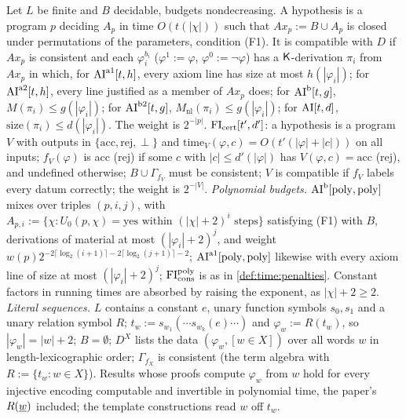 \begin{definition}\label{def:time:short}
Let $L$ be finite and $B$ decidable, budgets nondecreasing. A hypothesis is a program $p$ deciding $A_p$ in time $O(t(|\chi|))$ such that $Ax_p:=B\cup A_p$ is closed under permutations of the parameters, condition (F1). It is compatible with $D$ if $Ax_p$ is consistent and each $\varphi_i^{b_i}$ ($\varphi^1:=\varphi$, $\varphi^0:=\neg\varphi$) has a $\mathsf{K}$-derivation $\pi_i$ from $Ax_p$ in which, for $\mathrm{AI}^{\mathrm{a1}}[t,h]$, every axiom line has size at most $h(|\varphi_i|)$; for $\mathrm{AI}^{\mathrm{a2}}[t,h]$, every line justified as a member of $Ax_p$ does; for $\mathrm{AI}^{\mathrm b}[t,g]$, $M(\pi_i)\le g(|\varphi_i|)$; for $\mathrm{AI}^{\mathrm{b2}}[t,g]$, $M_{\mathrm{nl}}(\pi_i)\le g(|\varphi_i|)$; for $\mathrm{AI}[t,d]$, $\mathrm{size}(\pi_i)\le d(|\varphi_i|)$. The weight is $2^{-|p|}$.
$\mathrm{FI}_{\mathrm{cert}}[t',d']$: a hypothesis is a program $V$ with outputs in $\{\mathrm{acc},\mathrm{rej},\perp\}$ and $\mathrm{time}_V(\varphi,c)=O(t'(|\varphi|+|c|))$ on all inputs; $f_V(\varphi)$ is acc (rej) if some $c$ with $|c|\le d'(|\varphi|)$ has $V(\varphi,c)=\mathrm{acc}$ (rej), and undefined otherwise; $B\cup\Gamma_{f_V}$ must be consistent; $V$ is compatible if $f_V$ labels every datum correctly; the weight is $2^{-|V|}$.
\emph{Polynomial budgets.} $\mathrm{AI}^{\mathrm b}[\mathrm{poly},\mathrm{poly}]$ mixes over triples $(p,i,j)$, with $A_{p,i}:=\{\chi:U_0(p,\chi)=\text{yes within }(|\chi|+2)^i\text{ steps}\}$ satisfying (F1) with $B$, derivations of material at most $(|\varphi_i|+2)^j$, and weight $w(p)2^{-2\lceil\log_2(i+1)\rceil-2\lceil\log_2(j+1)\rceil-2}$; $\mathrm{AI}^{\mathrm{a1}}[\mathrm{poly},\mathrm{poly}]$ likewise with every axiom line of size at most $(|\varphi_i|+2)^j$; $\mathrm{FI}_{\mathrm{cons}}^{\mathrm{poly}}$ is as in \cref{def:time:penalties}. Constant factors in running times are absorbed by raising the exponent, as $|\chi|+2\ge2$.
\emph{Literal sequences.} $L$ contains a constant $e$, unary function symbols $s_0,s_1$ and a unary relation symbol $R$; $t_w:=s_{w_1}(\cdots s_{w_k}(e)\cdots)$ and $\varphi_w:=R(t_w)$, so $|\varphi_w|=|w|+2$; $B=\emptyset$; $D^X$ lists the data $(\varphi_w,[w\in X])$ over all words $w$ in length-lexicographic order; $\Gamma_{f_X}$ is consistent (the term algebra with $R:=\{t_w:w\in X\}$). Results whose proofs compute $\varphi_w$ from $w$ hold for every injective encoding computable and invertible in polynomial time, the paper's $R(\underline{w})$ included; the template constructions read $w$ off $t_w$.
\end{definition}

